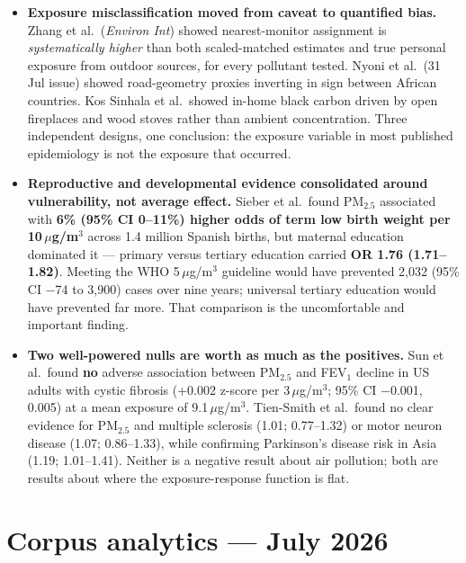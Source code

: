 \documentclass[10pt]{article}
\begin{document}
\begin{itemize}
\item \textbf{Exposure misclassification moved from caveat to quantified bias.} Zhang
et al.\ (\textit{Environ Int}) showed nearest-monitor assignment is \emph{systematically
higher} than both scaled-matched estimates and true personal exposure from outdoor
sources, for every pollutant tested. Nyoni et al.\ (31 Jul issue) showed road-geometry
proxies inverting in sign between African countries. Kos Sinhala et al.\ showed in-home
black carbon driven by open fireplaces and wood stoves rather than ambient concentration.
Three independent designs, one conclusion: the exposure variable in most published
epidemiology is not the exposure that occurred.

\item \textbf{Reproductive and developmental evidence consolidated around
vulnerability, not average effect.} Sieber et al.\ found PM$_{2.5}$ associated with
\textbf{6\% (95\% CI 0--11\%) higher odds of term low birth weight per 10\,$\mu$g/m$^3$}
across 1.4 million Spanish births, but maternal education dominated it --- primary versus
tertiary education carried \textbf{OR 1.76 (1.71--1.82)}. Meeting the WHO 5\,$\mu$g/m$^3$
guideline would have prevented 2{,}032 (95\% CI $-$74 to 3{,}900) cases over nine years;
universal tertiary education would have prevented far more. That comparison is the
uncomfortable and important finding.

\item \textbf{Two well-powered nulls are worth as much as the positives.} Sun et al.\
found \textbf{no} adverse association between PM$_{2.5}$ and FEV$_1$ decline in US adults
with cystic fibrosis (+0.002 z-score per 3\,$\mu$g/m$^3$; 95\% CI $-$0.001, 0.005) at a
mean exposure of 9.1\,$\mu$g/m$^3$. Tien-Smith et al.\ found no clear evidence for
PM$_{2.5}$ and multiple sclerosis (1.01; 0.77--1.32) or motor neuron disease (1.07;
0.86--1.33), while confirming Parkinson's disease risk in Asia (1.19; 1.01--1.41).
Neither is a negative result about air pollution; both are results about where the
exposure-response function is flat.
\end{itemize}

\vspace{3mm}

\section*{\sffamily\bfseries\color{Deep}Corpus analytics --- July 2026}
\vspace{-1.5mm}{\color{Coral}\rule{\linewidth}{1.1pt}}\vspace{2.5mm}
\end{document}
